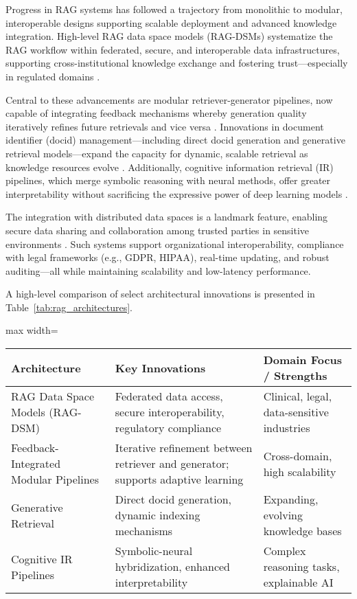 \documentclass[sigconf]{acmart}
\begin{document}
Progress in RAG systems has followed a trajectory from monolithic to modular, interoperable designs supporting scalable deployment and advanced knowledge integration. High-level RAG data space models (RAG-DSMs) systematize the RAG workflow within federated, secure, and interoperable data infrastructures, supporting cross-institutional knowledge exchange and fostering trust—especially in regulated domains \cite{ref64}.

Central to these advancements are modular retriever-generator pipelines, now capable of integrating feedback mechanisms whereby generation quality iteratively refines future retrievals and vice versa \cite{ref4,ref5,ref14,ref15,ref22,ref28,ref33,ref36,ref37,ref38,ref47,ref54,ref63,ref64}. Innovations in document identifier (docid) management—including direct docid generation and generative retrieval models—expand the capacity for dynamic, scalable retrieval as knowledge resources evolve \cite{ref45,ref52,ref54}. Additionally, cognitive information retrieval (IR) pipelines, which merge symbolic reasoning with neural methods, offer greater interpretability without sacrificing the expressive power of deep learning models \cite{ref31,ref37,ref47}.

The integration with distributed data spaces is a landmark feature, enabling secure data sharing and collaboration among trusted parties in sensitive environments \cite{ref64}. Such systems support organizational interoperability, compliance with legal frameworks (e.g., GDPR, HIPAA), real-time updating, and robust auditing—all while maintaining scalability and low-latency performance.

A high-level comparison of select architectural innovations is presented in Table~\ref{tab:rag_architectures}.

\begin{table*}[htbp]
\centering
\caption{Notable RAG architectural innovations and their domain strengths.}
\label{tab:rag_architectures}
\begin{adjustbox}{max width=\textwidth}
\begin{tabular}{lll}
\toprule
\textbf{Architecture} & \textbf{Key Innovations} & \textbf{Domain Focus / Strengths} \\
\midrule
RAG Data Space Models (RAG-DSM) & Federated data access, secure interoperability, regulatory compliance & Clinical, legal, data-sensitive industries \\
Feedback-Integrated Modular Pipelines & Iterative refinement between retriever and generator; supports adaptive learning & Cross-domain, high scalability \\
Generative Retrieval & Direct docid generation, dynamic indexing mechanisms & Expanding, evolving knowledge bases \\
Cognitive IR Pipelines & Symbolic-neural hybridization, enhanced interpretability & Complex reasoning tasks, explainable AI \\
\bottomrule
\end{tabular}
\end{adjustbox}
\end{table*}
\end{document}
